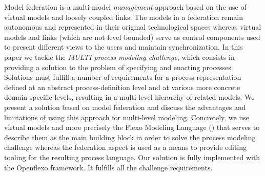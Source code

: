 Model federation is a multi-model \emph{management} approach based on the use of virtual models and loosely coupled links. The models in a federation remain autonomous and represented in their original technological spaces whereas virtual models and links (which are not level bounded) serve as control components used to present different views to the users and  maintain synchronization. In this paper we tackle the \emph{MULTI process modeling challenge}, which consists in providing a solution to the problem of specifying and enacting processes. Solutions must fulfill a number of requirements for a process representation defined at an abstract process-definition level and at various more concrete domain-specific levels, resulting in a multi-level hierarchy of related models. We present a solution based on model federation and discuss the advantages and limitations of using this approach for multi-level modeling. Concretely, we use virtual models and more precisely the Flexo Modeling Language (\FML) that serves to describe them as the main building block in order to solve the process modeling challenge whereas the federation aspect is used as a means to provide editing tooling for the resulting process language. Our solution is fully implemented with the Openflexo framework. It fulfills all the challenge requirements.

